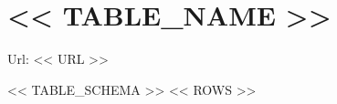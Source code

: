 \section{<< TABLE_NAME >>}

Url: << URL >>

\begin{tabular}{ << TABLE_SCHEMA >> }
  << ROWS >>
\end{tabular}
